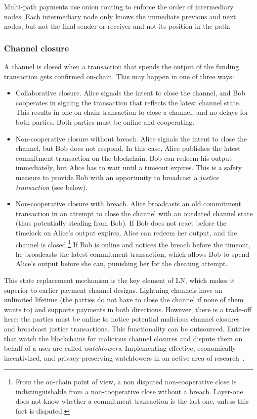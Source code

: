 Multi-path payments use onion routing to enforce the order of intermediary nodes.
Each intermediary node only knows the immediate previous and next nodes, but not the final sender or receiver and not its position in the path.


\subsubsection*{Channel closure}

A channel is closed when a transaction that spends the output of the funding transaction gets confirmed on-chain.
This may happen in one of three ways:

\begin{itemize}
	\item Collaborative closure. Alice signals the intent to close the channel, and Bob cooperates in signing the transaction that reflects the latest channel state. This results in one on-chain transaction to close a channel, and no delays for both parties. Both parties must be online and cooperating.
	\item Non-cooperative closure without breach. Alice signals the intent to close the channel, but Bob does not respond. In this case, Alice publishes the latest commitment transaction on the blockchain. Bob can redeem his output immediately, but Alice has to wait until a timeout expires. This is a safety measure to provide Bob with an opportunity to broadcast a \textit{justice transaction} (see below).
	\item Non-cooperative closure with breach. Alice broadcasts an old commitment transaction in an attempt to close the channel with an outdated channel state (thus potentially stealing from Bob). If Bob does not react before the timelock on Alice's output expires, Alice can redeem her output, and the channel is closed.\footnote{From the on-chain point of view, a non disputed non-cooperative close is indistinguishable from a non-cooperative close without a breach. Layer-one does not know whether a commitment transaction is the last one, unless this fact is disputed.} If Bob is online and notices the breach before the timeout, he broadcasts the latest commitment transaction, which allows Bob to spend Alice's output before she can, punishing her for the cheating attempt.
\end{itemize}

This state replacement mechanism is the key element of LN, which makes it superior to earlier payment channel designs.
Lightning channels have an unlimited lifetime (the parties do not have to close the channel if none of them wants to) and supports payments in both directions.
However, there is a trade-off here: the parties must be online to notice potential malicious channel closures and broadcast justice transactions.
This functionality can be outsourced.
Entities that watch the blockchains for malicious channel closures and dispute them on behalf of a user are called \textit{watchtowers}.
Implementing effective, economically incentivized, and privacy-preserving watchtowers in an active area of research~\cite{McCorry2019}.

